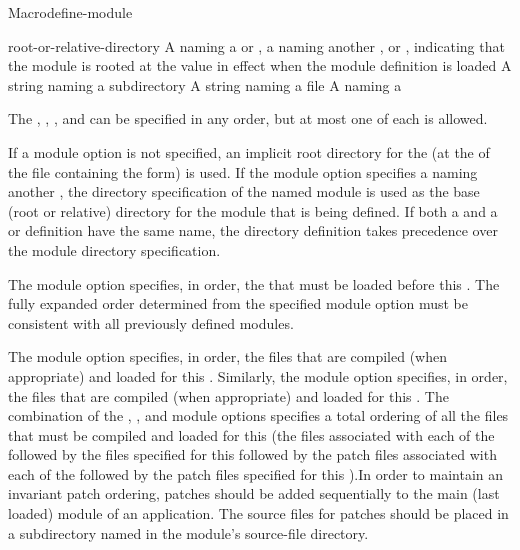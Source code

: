 \documentclass[10pt,twoside,english,pdftex]{article}
\begin{document}
\begin{functiondoc}{Macro}{define-module}{%
    }
\fnterms
\begin{args}{root-or-relative-directory}
 A  naming a  or
  , a  naming another ,
  or \nil{}, indicating that the module is rooted at the
   value in effect when the module definition is
  loaded
\arg[subdirectory] A string naming a subdirectory
 A string naming a file
 A  naming a 
\end{args}

\fndescription The  ,
, , and  can be specified
in any order, but at most one of each is allowed.

If a  module option is not specified, an implicit root
directory for the  (at the  of the
file containing the  form) is used.  If the
 module option specifies a  naming
another , the directory specification of the named module is
used as the base (root or relative) directory for the module that is being
defined.  If both a  and a  or
 definition have the same name, the directory
definition takes precedence over the module directory specification.

The  module option specifies, in order, the 
that must be loaded before this .  The fully expanded
 order determined from the specified
 module option must be consistent with all previously
defined modules.

The  module option specifies, in order, the files that are
compiled (when appropriate) and loaded for this .  Similarly,
the  module option specifies, in order, the
 files that are compiled (when appropriate) and loaded for this
.  The combination of the ,
, and  module options specifies a total
ordering of all the files that must be compiled and loaded for this
 (the files associated with each of the 
followed by the files specified for this  followed by the patch
files associated with each of the  followed by the
patch files specified for this ).In order to maintain an
invariant patch ordering, patches should be added sequentially to the main
(last loaded) module of an application. The source files for patches should be
placed in a subdirectory named  in the module's
source-file directory.


\end{functiondoc}
\end{document}
